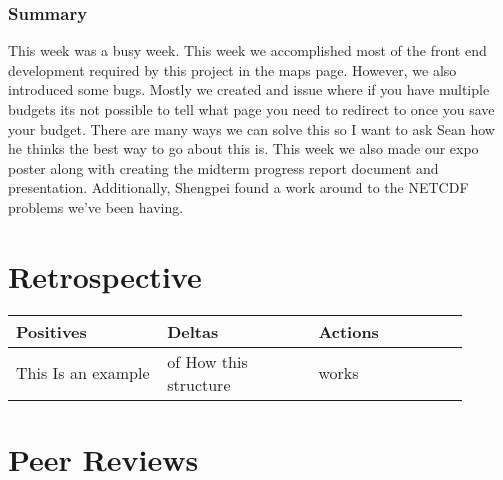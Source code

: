 \documentclass[onecolumn, draftclsnofoot,10pt, compsoc]{article}
\begin{document}
			\subsubsection{Summary} This week was a busy week. This week we accomplished most of the front end development required by this project in the maps page. However, we also introduced some bugs. Mostly we created and issue where if you have multiple budgets its not possible to tell what page you need to redirect to once you save your budget. There are many ways we can solve this so I want to ask Sean how he thinks the best way to go about this is. This week we also made our expo poster along with creating the midterm progress report document and presentation. Additionally, Shengpei found a work around to the NETCDF problems we've been having.\\

\section{Retrospective}
	\begin{center}
		\begin{tabular}{| p{0.3\linewidth} | p{0.3\linewidth} | p{0.3\linewidth} |}
		\hline
		Positives & Deltas & Actions \\ \hline
		This Is an example & of How this structure & works \\ \hline
	\end{tabular}
\end{center}
	
	
\section{Peer Reviews}
\end{document}
